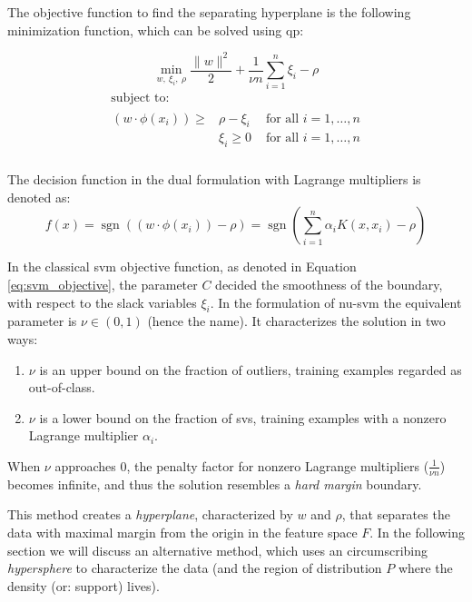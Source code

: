 The objective function to find the separating hyperplane is the following minimization function, which can be solved using \gls{qp}:

\begin{equation}\label{eq:nu-svm_objective}
  \operatorname*{min}_{w,\ \xi_i,\ \rho } \frac{\lVert w \rVert ^2}{2} + \frac{1}{\nu n} \sum_{i=1}^n \xi_i - \rho
\end{equation}
\begin{equation}
  \begin{multlined}
    \mbox{ subject to: } \\
    \begin{aligned}
      (w \cdot \phi(x_i)) \geq & \rho - \xi_i & \mbox{ for all } i = 1, \dots, n \\
      & \xi_i \geq 0 & \mbox{ for all } i = 1, \dots, n \\
    \end{aligned}
  \end{multlined}
\end{equation}

The decision function in the dual formulation with Lagrange multipliers is denoted as:
\begin{equation}\label{eq:nu-svm_lagrange}
f(x) = \operatorname{sgn}((w \cdot \phi(x_i)) - \rho) = \operatorname{sgn}( \sum_{i=1}^n \alpha_i K(x, x_i) - \rho)
\end{equation}

In the classical \gls{svm} objective function, as denoted in Equation \ref{eq:svm_objective}, the parameter $C$ decided the smoothness of the boundary, with respect to the slack variables $\xi_i$.
In the formulation of \gls{nu-svm} the equivalent parameter is $\nu \in (0,1)$ (hence the name).
It characterizes the solution in two ways:
\begin{enumerate}
  \item $\nu$ is an upper bound on the fraction of outliers, \ie training examples regarded as out-of-class.
  \item $\nu$ is a lower bound on the fraction of \gls{sv}s, \ie training examples with a nonzero Lagrange multiplier $\alpha_i$.
\end{enumerate}
When $\nu$ approaches $0$, the penalty factor for nonzero Lagrange multipliers ($\frac{1}{\nu n}$) becomes infinite, and thus the solution resembles a \emph{hard margin} boundary.

This method creates a \emph{hyperplane}, characterized by $w$ and $\rho$, that separates the data with maximal margin from the origin in the feature space $F$.
In the following section we will discuss an alternative method, which uses an circumscribing \emph{hypersphere} to characterize the data (and the region of distribution $P$ where the density (or: support) lives).


